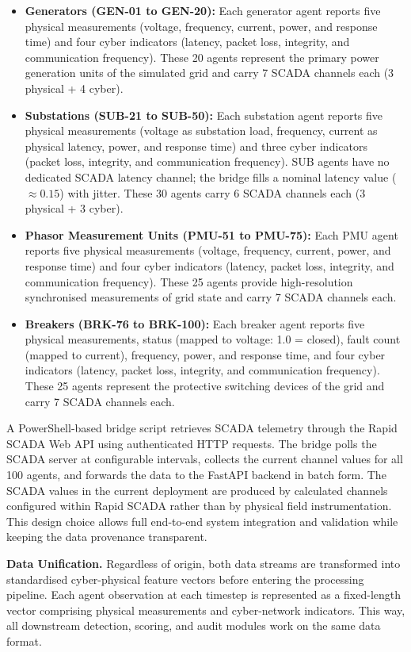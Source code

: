 \begin{itemize}
    \item \textbf{Generators (GEN-01 to GEN-20):} Each generator agent reports five physical measurements (voltage, frequency, current, power, and response time) and four cyber indicators (latency, packet loss, integrity, and communication frequency). These 20 agents represent the primary power generation units of the simulated grid and carry 7 SCADA channels each (3 physical + 4 cyber).
    \item \textbf{Substations (SUB-21 to SUB-50):} Each substation agent reports five physical measurements (voltage as substation load, frequency, current as physical latency, power, and response time) and three cyber indicators (packet loss, integrity, and communication frequency). SUB agents have no dedicated SCADA latency channel; the bridge fills a nominal latency value ($\approx 0.15$) with jitter. These 30 agents carry 6 SCADA channels each (3 physical + 3 cyber).
    \item \textbf{Phasor Measurement Units (PMU-51 to PMU-75):} Each PMU agent reports five physical measurements (voltage, frequency, current, power, and response time) and four cyber indicators (latency, packet loss, integrity, and communication frequency). These 25 agents provide high-resolution synchronised measurements of grid state and carry 7 SCADA channels each.
    \item \textbf{Breakers (BRK-76 to BRK-100):} Each breaker agent reports five physical measurements, status (mapped to voltage: 1.0 = closed), fault count (mapped to current), frequency, power, and response time, and four cyber indicators (latency, packet loss, integrity, and communication frequency). These 25 agents represent the protective switching devices of the grid and carry 7 SCADA channels each.
\end{itemize}

A PowerShell-based bridge script retrieves SCADA telemetry through the Rapid SCADA Web API using authenticated HTTP requests. The bridge polls the SCADA server at configurable intervals, collects the current channel values for all 100 agents, and forwards the data to the FastAPI backend in batch form. The SCADA values in the current deployment are produced by calculated channels configured within Rapid SCADA rather than by physical field instrumentation. This design choice allows full end-to-end system integration and validation while keeping the data provenance transparent.

\par \vspace{0.35cm}
\textbf{Data Unification.} Regardless of origin, both data streams are transformed into standardised cyber-physical feature vectors before entering the processing pipeline. Each agent observation at each timestep is represented as a fixed-length vector comprising physical measurements and cyber-network indicators. This way, all downstream detection, scoring, and audit modules work on the same data format.

